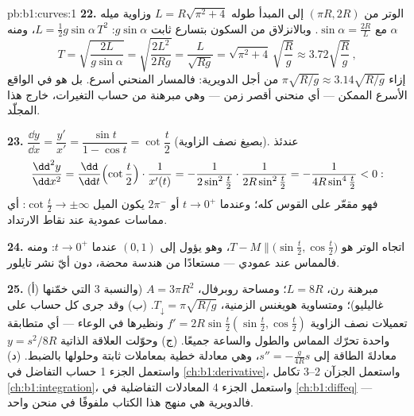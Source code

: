 \begin{solution}{pb:b1:curves:1}
\textbf{22.} الوتر من  $(\pi R, 2R)$ إلى المبدأ
طوله $L = R\sqrt{\pi^2 + 4}$ وزاوية ميله $\alpha$ مع
$\sin\alpha = \frac{2R}{L}$. وبالانزلاق من السكون بتسارع
ثابت $g\sin\alpha$: $L = \frac12 g\sin\alpha\,T^2$، ومنه
\[
T = \sqrt{\frac{2L}{g\sin\alpha}} = \sqrt{\frac{2L^2}{2Rg}}
= \frac{L}{\sqrt{Rg}} = \sqrt{\pi^2 + 4}\,\sqrt{\frac Rg}
\approx 3.72\sqrt{\frac Rg}\,,
\]
إزاء $\pi\sqrt{R/g} \approx 3.14\sqrt{R/g}$ من أجل الدويرية:
فالمسار المنحني أسرع. بل هو في الواقع الأسرع الممكن
--- أي منحني أقصر زمن --- وهي مبرهنة من حساب
التغيرات، خارج هذا المجلّد.

\textbf{23.} $\dfrac{\dd y}{\dd x} = \dfrac{y'}{x'} =
\dfrac{\sin t}{1 - \cos t} = \cot\dfrac t2$ (بصيغ
نصف الزاوية). عندئذ
\[
\frac{\dd^2y}{\dd x^2}
= \frac{\dd}{\dd t}\Bigl(\cot\frac t2\Bigr)\cdot\frac{1}{x'(t)}
= -\frac{1}{2\sin^2\frac t2}\cdot\frac{1}{2R\sin^2\frac t2}
= -\frac{1}{4R\sin^4\frac t2} < 0 :
\]
فهو مقعّر على القوس كله؛ وعندما $t \to 0^+$ أو $2\pi^-$ يكون
الميل $\cot\frac t2 \to \pm\infty$: أي مماسات عمودية عند
نقاط الارتداد.

\textbf{24.} اتجاه الوتر هو $T - M \parallel
\bigl(\sin\frac t2, \cos\frac t2\bigr)$، وهو يؤول إلى $(0, 1)$
عندما $t \to 0^{+}$: ومنه فالمماس عند  عمودي ---
مستعادًا من هندسة محضة، دون أيّ نشر تايلور.

\textbf{25.} (أ) مبرهنة رن، $L = 8R$؛ ومساحة روبرفال، $A =
3\pi R^2$ (والنسبة $3$ التي خمّنها غاليليو)؛ ومتساوية
هويغنس الزمنية، $T_\downarrow = \pi\sqrt{R/g}$. (ب) وقد جرى كل
حساب على تعميلات نصف الزاوية $f' =
2R\sin\frac t2(\sin\frac t2, \cos\frac t2)$ ونظيرها في الوعاء
--- أي متطابقة واحدة تحرّك المماس والطول والساعة
جميعًا. (ج) وحوّلت العلاقة الذاتية $y = s^2/8R$
معادلةَ الطاقة إلى $s'' = -\frac{g}{4R}s$، وهي معادلة خطية
بمعاملات ثابتة وحلولها 
بالضبط. (د) واستعمل الجزء 1 حساب التفاضل في
\cref{ch:b1:derivative}، واستعمل الجزآن 2--3 تكامل
\cref{ch:b1:integration}، واستعمل الجزء 4 المعادلات التفاضلية في
\cref{ch:b1:diffeq} --- فالدويرية هي منهج هذا الكتاب
ملفوفًا في منحن واحد.
\end{solution}
